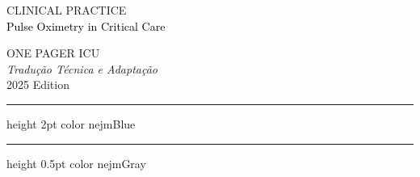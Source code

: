 \documentclass[9pt,a4paper]{article}
\begin{document}
\noindent
\begin{minipage}[b]{0.7\textwidth}
    {\fontsize{8}{10}\selectfont\headerfont\textcolor{nejmGray}{CLINICAL PRACTICE}} \\[4pt]
    {\titlefont\fontsize{22}{24}\selectfont\textcolor{black}{Pulse Oximetry in Critical Care}}
\end{minipage}\hfill
\begin{minipage}[b]{0.28\textwidth}
    \begin{flushright}
        {\fontsize{7}{9}\selectfont\headerfont\textcolor{nejmBlue}{ONE PAGER ICU}} \\
        {\fontsize{7}{9}\selectfont\textit{Tradução Técnica e Adaptação}} \\
        {\fontsize{7}{9}\selectfont\textcolor{nejmGray}{2025 Edition}}
    \end{flushright}
\end{minipage}

\vspace{0.2cm}
\hrule height 2pt color nejmBlue
\vspace{0.1cm}
\hrule height 0.5pt color nejmGray
\vspace{0.4cm}
\end{document}

